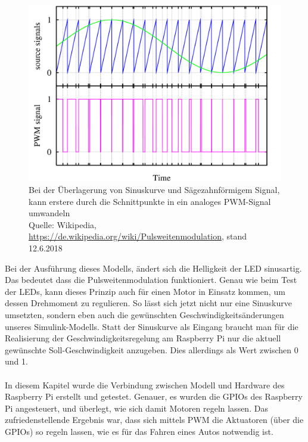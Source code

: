 \begin{figure}[htb]
  \centering  
  \includegraphics[scale=0.3]{img/sinussaw.png}
  \caption{Bei der Überlagerung von Sinuskurve und Sägezahnförmigem Signal, kann erstere durch die Schnittpunkte in ein analoges PWM-Signal umwandeln \\ Quelle: Wikipedia, \url{https://de.wikipedia.org/wiki/Pulsweitenmodulation}, stand 12.6.2018}
  \label{fig:Pulsweitenmodulation}
\end{figure}
Bei der Ausführung dieses Modells, ändert sich die Helligkeit der LED sinusartig. Das bedeutet dass die Pulsweitenmodulation funktioniert. Genau wie beim Test der LEDs, kann dieses Prinzip auch für einen Motor in Einsatz kommen, um dessen Drehmoment zu regulieren. So lässt sich jetzt nicht nur eine Sinuskurve umsetzten, sondern eben auch die gewünschten Geschwindigkeitsänderungen unseres Simulink-Modells. Statt der Sinuskurve als Eingang braucht man für die Realisierung der Geschwindigkeitsregelung am Raspberry Pi nur die aktuell gewünschte Soll-Geschwindigkeit anzugeben. Dies allerdings als Wert zwischen 0 und 1.  \\ \\

In diesem Kapitel wurde die Verbindung zwischen Modell und Hardware des Raspberry Pi erstellt und getestet. Genauer, es wurden die GPIOs des Raspberry Pi angesteuert, und überlegt, wie sich damit Motoren regeln lassen. Das zufriedenstellende Ergebnis war, dass sich mittels PWM die Aktuatoren (über die GPIOs) so regeln lassen, wie es für das Fahren eines Autos notwendig ist.


